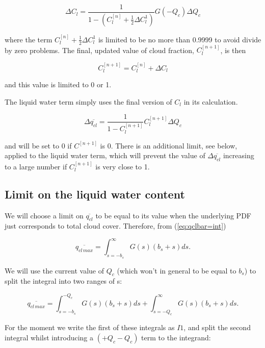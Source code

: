 \documentclass{UMDP_article}
\begin{document}
\begin{equation}
\Delta C_l =  \frac{1}{1-(C_l^{[n]} + \frac{1}{2} \Delta C_l^1)}
G(-Q_c) \Delta Q_c 
\end{equation}

where the term $C_l^{[n]} + \frac{1}{2} \Delta C_l^1$ is limited to be no more
than 0.9999 to avoid divide by zero problems. The final, updated value of
cloud fraction, $C_l^{[n+1]}$, is then

\begin{equation}
C_l^{[n+1]} = C_l^{[n]} + \Delta C_l
\end{equation}

and this value is limited to 0 or 1.

The liquid water term simply uses the final version of $C_l$ in its
calculation.

\begin{equation}
\Delta \overline{q_{cl}} = \frac{1}{1-C_l^{[n+1]}} C_l^{[n+1]} \Delta Q_c
\end{equation}

and will be set to 0 if $C^{[n+1]}$ is 0. There is an additional limit,
see below, applied to the liquid
water term, which will prevent the value of $\Delta \overline{q_{cl}}$
increasing to a large number if $C_l^{[n+1]}$ is very close to 1.

\subsection{Limit on the liquid water content}

We will choose a limit on $\overline{q_{cl}}$ to be equal to its value when
the underlying PDF just corresponds to total cloud cover. Therefore, from
(\ref{eq:qclbar=int})

\begin{equation}
\overline{q_{cl \, max}} = \int_{s=-b_s}^{\infty} G(s) (b_s + s) ds .
\end{equation}

We will use the current value of $Q_c$ (which won't in general to be equal to
$b_s$) to split the integral into two ranges of s:

\begin{equation}
\overline{q_{cl \, max}} = \int_{s=-b_s}^{-Q_c} G(s) (b_s + s) ds
+ \int_{s=-Q_c}^{\infty} G(s) (b_s + s) ds .
\end{equation}

For the moment we write the first of these integrals as $I1$, and split the
second integral whilst introducing a $(+ Q_c - Q_c)$ term to the integrand:
\end{document}
